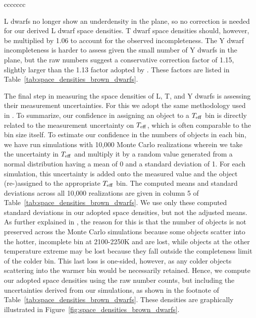 \documentclass[twocolumn,tighten,twocolappendix]{aastex631}
\begin{document}
\begin{deluxetable}{ccccccc}
\end{deluxetable}

L dwarfs no longer show an underdensity in the plane, so no correction is needed for our derived L dwarf space densities. T dwarf space densities should, however, be multiplied by 1.06 to account for the observed incompleteness.  The Y dwarf incompleteness is harder to assess given the small number of Y dwarfs in the plane, but the raw numbers suggest a conservative correction factor of 1.15, slightly larger than the 1.13 factor adopted by \cite{kirkpatrick2021}. These factors are listed in Table~\ref{tab:space_densities_brown_dwarfs}.

The final step in measuring the space densities of L, T, and Y dwarfs is assessing their measurement uncertainties. For this we adopt the same methodology used in \cite{kirkpatrick2021}. To summarize, our confidence in assigning an object to a $T_{\rm eff}$ bin is directly related to the measurement uncertainty on $T_{\rm eff}$, which is often comparable to the bin size itself. To estimate our confidence in the numbers of objects in each bin, we have run simulations with 10,000 Monte Carlo realizations wherein we take the uncertainty in $T_{\rm eff}$ and multiply it by a random value generated from a normal distribution having a mean of 0 and a standard deviation of 1. For each simulation, this uncertainty is added onto the measured value and the object (re-)assigned to the appropriate $T_{\rm eff}$ bin. The computed means and standard deviations across all 10,000 realizations are given in column 5 of Table~\ref{tab:space_densities_brown_dwarfs}. We use only these computed standard deviations in our adopted space densities, but not the adjusted means. As further explained in \cite{kirkpatrick2021}, the reason for this is that the number of objects is not preserved across the Monte Carlo simulations because some objects scatter into the hotter, incomplete bin at 2100-2250K and are lost, while objects at the other temperature extreme may be lost because they fall outside the completeness limit of the colder bin. This last loss is one-sided, however, as any colder objects scattering into the warmer bin would be necessarily retained. Hence, we compute our adopted space densities using the raw number counts, but including the uncertainties derived from our simulations, as shown in the footnote of Table~\ref{tab:space_densities_brown_dwarfs}. These densities are graphically illustrated in Figure~\ref{fig:space_densities_brown_dwarfs}.
\end{document}

